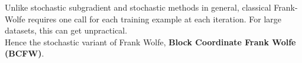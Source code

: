 Unlike stochastic subgradient and stochastic methods in general, classical
Frank-Wolfe requires one call for each training example at each iteration. For
large datasets, this can get unpractical.\\ Hence the stochastic variant of
Frank Wolfe, \textbf{Block Coordinate Frank Wolfe (BCFW)}.\\



